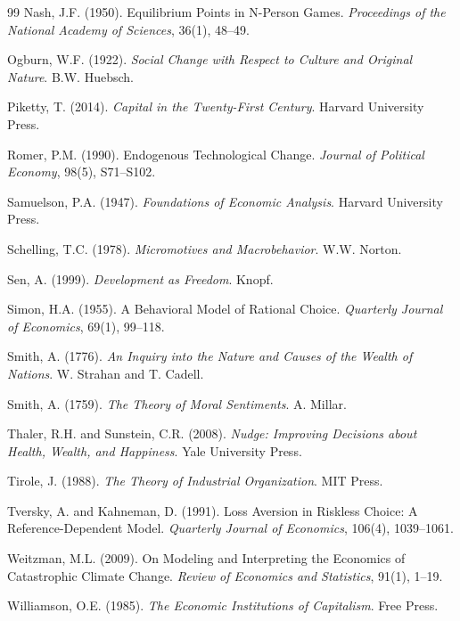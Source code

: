 \documentclass[12pt,a4paper]{article}
\begin{document}
\begin{thebibliography}{99}
Nash, J.F. (1950).
Equilibrium Points in N-Person Games.
\emph{Proceedings of the National Academy of Sciences}, 36(1), 48–49.

Ogburn, W.F. (1922).
\emph{Social Change with Respect to Culture and Original Nature}.
B.W. Huebsch.

Piketty, T. (2014).
\emph{Capital in the Twenty-First Century}.
Harvard University Press.

Romer, P.M. (1990).
Endogenous Technological Change.
\emph{Journal of Political Economy}, 98(5), S71–S102.

Samuelson, P.A. (1947).
\emph{Foundations of Economic Analysis}.
Harvard University Press.

Schelling, T.C. (1978).
\emph{Micromotives and Macrobehavior}.
W.W. Norton.

Sen, A. (1999).
\emph{Development as Freedom}.
Knopf.

Simon, H.A. (1955).
A Behavioral Model of Rational Choice.
\emph{Quarterly Journal of Economics}, 69(1), 99–118.

Smith, A. (1776).
\emph{An Inquiry into the Nature and Causes of the Wealth of Nations}.
W. Strahan and T. Cadell.

Smith, A. (1759).
\emph{The Theory of Moral Sentiments}.
A. Millar.

Thaler, R.H. and Sunstein, C.R. (2008).
\emph{Nudge: Improving Decisions about Health, Wealth, and Happiness}.
Yale University Press.

Tirole, J. (1988).
\emph{The Theory of Industrial Organization}.
MIT Press.

Tversky, A. and Kahneman, D. (1991).
Loss Aversion in Riskless Choice: A Reference-Dependent Model.
\emph{Quarterly Journal of Economics}, 106(4), 1039–1061.

Weitzman, M.L. (2009).
On Modeling and Interpreting the Economics of Catastrophic Climate Change.
\emph{Review of Economics and Statistics}, 91(1), 1–19.

Williamson, O.E. (1985).
\emph{The Economic Institutions of Capitalism}.
Free Press.


\end{thebibliography}
\end{document}
